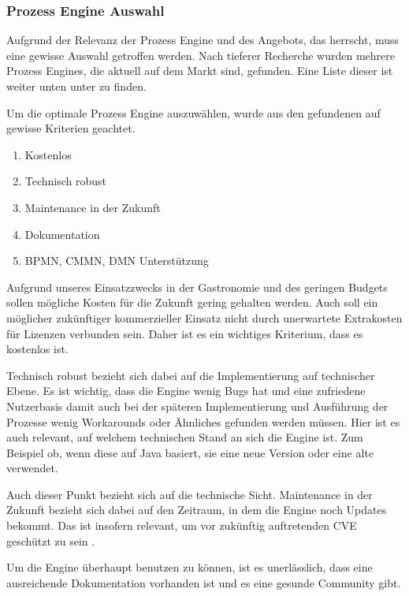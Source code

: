 \subsubsection{Prozess Engine Auswahl}
\label{sec:process_engine_auswahl}

Aufgrund der Relevanz der Prozess Engine und des Angebots, das herrscht, muss eine gewisse Auswahl getroffen werden. Nach tieferer Recherche wurden mehrere Prozess Engines, die aktuell auf dem Markt sind, gefunden. Eine Liste dieser ist weiter unten unter  zu finden. 

Um die optimale Prozess Engine auszuwählen, wurde aus den gefundenen auf gewisse Kriterien geachtet. 
\begin{enumerate}
    \item Kostenlos
    \item Technisch robust
    \item Maintenance in der Zukunft
    \item Dokumentation
    \item \acs{BPMN}, \acs{CMMN}, \acs{DMN} Unterstützung
\end{enumerate}

\label{par:kostenlose_process_engines_auswahl}
Aufgrund unseres Einsatzzwecks in der Gastronomie und des geringen Budgets sollen mögliche Kosten für die Zukunft gering gehalten werden. Auch soll ein möglicher zukünftiger kommerzieller Einsatz nicht durch unerwartete Extrakosten für Lizenzen verbunden sein. Daher ist es ein wichtiges Kriterium, dass es kostenlos ist.

Technisch robust bezieht sich dabei auf die Implementierung auf technischer Ebene. Es ist wichtig, dass die Engine wenig Bugs hat und eine zufriedene Nutzerbasis damit auch bei der späteren Implementierung und Ausführung der Prozesse wenig Workarounds oder Ähnliches gefunden werden müssen. Hier ist es auch relevant, auf welchem technischen Stand an sich die Engine ist. Zum Beispiel ob, wenn diese auf Java basiert, sie eine neue Version oder eine alte verwendet. 

Auch dieser Punkt bezieht sich auf die technische Sicht. Maintenance in der Zukunft bezieht sich dabei auf den Zeitraum, in dem die Engine noch Updates bekommt. Das ist insofern relevant, um vor zukünftig auftretenden \acs{CVE} geschützt zu sein  \citep{mitre_cve_2024}.

Um die Engine überhaupt benutzen zu können, ist es unerlässlich, dass eine ausreichende Dokumentation vorhanden ist und es eine gesunde Community gibt.

